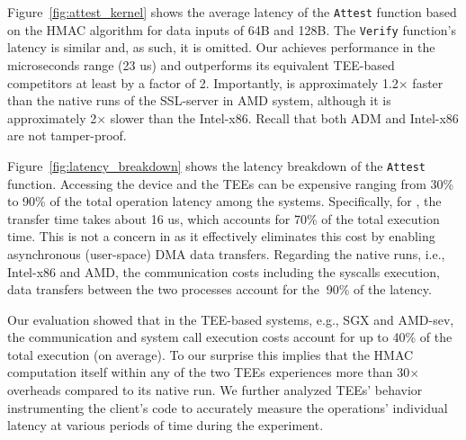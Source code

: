 

Figure~\ref{fig:attest_kernel} shows the average latency of the {\tt Attest} function based on the HMAC algorithm for data inputs of 64B and 128B. The {\tt Verify} function's latency is similar and, as such, it is omitted. Our \projecttitle{} achieves performance in the microseconds range (23 us) and outperforms its equivalent TEE-based competitors at least by a factor of 2. Importantly, \projecttitle{} is approximately 1.2$\times$ faster than the native runs of the SSL-server in AMD system, although it is approximately 2$\times$ slower than the Intel-x86. Recall that both ADM and Intel-x86 are not tamper-proof.

Figure~\ref{fig:latency_breakdown} shows the latency breakdown of the  {\tt Attest} function. Accessing the \projecttitle{} device and the TEEs can be expensive ranging from 30\% to 90\% of the total operation latency among the systems. Specifically, for \projecttitle{}, the transfer time takes about 16 us, which accounts for 70\% of the total execution time. This is not a concern in \projecttitle{} as it effectively eliminates this cost by enabling asynchronous (user-space) DMA data transfers. Regarding the native runs, i.e., Intel-x86 and AMD, the communication costs including the syscalls execution, data transfers between the two processes account for the $~$90\% of the latency.  

Our evaluation showed that in the TEE-based systems, e.g., SGX and AMD-sev, the communication and system call execution costs account for up to 40\% of the total execution (on average). To our surprise this implies that the HMAC computation itself within any of the two TEEs experiences more than 30$\times$ overheads compared to its native run. We further analyzed TEEs' behavior instrumenting the client's code to accurately measure the operations' individual latency at various periods of time during the experiment. 

